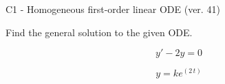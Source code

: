 \begin{exercise}
  \begin{exerciseTitle}C1 - Homogeneous first-order linear ODE (ver. 41)\end{exerciseTitle}
  \begin{exerciseStatement}
    
Find the general solution to the given ODE.

    
\[y'-2y=0\]

  \end{exerciseStatement}
  \begin{exerciseAnswer}
    
\[y= k e^{\left(2 \, t\right)}\]

  \end{exerciseAnswer}
\end{exercise}